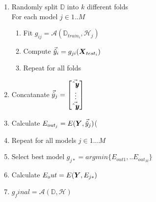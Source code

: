 \documentclass[12pt]{article}
\newcommand{\D}{\mathbb{D}}
\newcommand{\calA}{\mathcal{A}}
\newcommand{\calH}{\mathcal{H}}
\begin{document}
\begin{enumerate}
\begin{enumerate}
\item Randomly split $\D$ into $k$ different folds\\
For each model $j\in{1..M}$
	\begin{enumerate}
	\item Fit $g_{ij}=\calA(\D_{train_i}, \calH_j)$
    \item Compute $\vec{\hat{y}}_i=g_{ji}(\boldsymbol{X}_{test_i})$
    \item Repeat for all folds
	\end{enumerate}
\item Concatanate $\vec{\hat{y}}_{j}=\begin{bmatrix}
\vec{\hat{\boldsymbol{y}}_1} \\ \vdots \\\vec{\hat{\boldsymbol{y}}_k}\end{bmatrix}$  
\item Calculate $E_{out_j}=E(\boldsymbol{Y}, \vec{\hat{y}}_j)$(%
\item Repeat for all models $j\in1...M$
\item Select best model $g_{j*}=argmin\{E_{out1},..E_{out_M}\}$
\item Calculate $E_out=E(\boldsymbol{Y}, E_{j*})$
\item $g_final=\calA(\D, \calH)$
\end{enumerate}

\end{enumerate}


\end{document}
